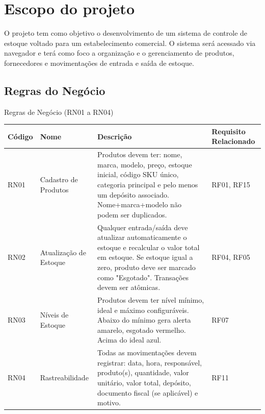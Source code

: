 \documentclass[
	12pt,				%
	openany,			%
	twoside,			%
	a4paper,			%
	english,			%
	brazil				%
	]{abntex2}
\begin{document}
\section{Escopo do projeto}

O projeto tem como objetivo o desenvolvimento de um sistema de controle de estoque voltado para um estabelecimento comercial. O sistema será acessado via navegador e terá como foco a organização e o gerenciamento de produtos, fornecedores e movimentações de entrada e saída de estoque.




\subsection{Regras do Negócio}



\begin{quadro}[htb]
\caption{\label{quadro_rn1}Regras de Negócio (RN01 a RN04)}
\begin{tabular}{|p{1.2cm}|p{4.0cm}|p{7.5cm}|p{2.0cm}|}
    \hline
    \textbf{Código} & \textbf{Nome} & \textbf{Descrição} & \textbf{Requisito Relacionado} \\ \hline

    RN01 & Cadastro de Produtos & Produtos devem ter: nome, marca, modelo, preço, estoque inicial, código SKU único, categoria principal e pelo menos um depósito associado. Nome+marca+modelo não podem ser duplicados. & RF01, RF15 \\ \hline

    RN02 & Atualização de Estoque & Qualquer entrada/saída deve atualizar automaticamente o estoque e recalcular o valor total em estoque. Se estoque igual a zero, produto deve ser marcado como "Esgotado". Transações devem ser atômicas. & RF04, RF05 \\ \hline

    RN03 & Níveis de Estoque & Produtos devem ter nível mínimo, ideal e máximo configuráveis. Abaixo do mínimo gera alerta amarelo, esgotado vermelho. Acima do ideal azul. & RF07 \\ \hline

    RN04 & Rastreabilidade & Todas as movimentações devem registrar: data, hora, responsável, produto(s), quantidade, valor unitário, valor total, depósito, documento fiscal (se aplicável) e motivo. & RF11 \\ \hline

    

\end{tabular}
\end{quadro}
\end{document}
